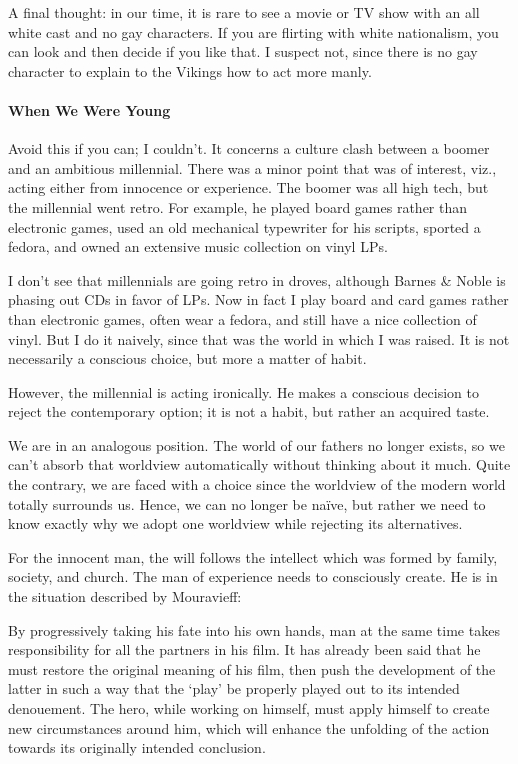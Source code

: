 A final thought: in our time, it is rare to see a movie or TV show with an all white cast and no gay characters. If you are flirting with white nationalism, you can look and then decide if you like that. I suspect not, since there is no gay character to explain to the Vikings how to act more manly.

\paragraph{When We Were Young}


Avoid this if you can; I couldn't. It concerns a culture clash between a boomer and an ambitious millennial. There was a minor point that was of interest, viz., acting either from innocence or experience. The boomer was all high tech, but the millennial went retro. For example, he played board games rather than electronic games, used an old mechanical typewriter for his scripts, sported a fedora, and owned an extensive music collection on vinyl LPs.

I don't see that millennials are going retro in droves, although Barnes \& Noble is phasing out CDs in favor of LPs. Now in fact I play board and card games rather than electronic games, often wear a fedora, and still have a nice collection of vinyl. But I do it naively, since that was the world in which I was raised. It is not necessarily a conscious choice, but more a matter of habit.

However, the millennial is acting ironically. He makes a conscious decision to reject the contemporary option; it is not a habit, but rather an acquired taste.

We are in an analogous position. The world of our fathers no longer exists, so we can't absorb that worldview automatically without thinking about it much. Quite the contrary, we are faced with a choice since the worldview of the modern world totally surrounds us. Hence, we can no longer be naïve, but rather we need to know exactly why we adopt one worldview while rejecting its alternatives.

For the innocent man, the will follows the intellect which was formed by family, society, and church. The man of experience needs to consciously create. He is in the situation described by Mouravieff:

\begin{quotex}
By progressively taking his fate into his own hands, man at the same time takes responsibility for all the partners in his film. It has already been said that he must restore the original meaning of his film, then push the development of the latter in such a way that the `play' be properly played out to its intended denouement. The hero, while working on himself, must apply himself to create new circumstances around him, which will enhance the unfolding of the action towards its originally intended conclusion.
\end{quotex}



